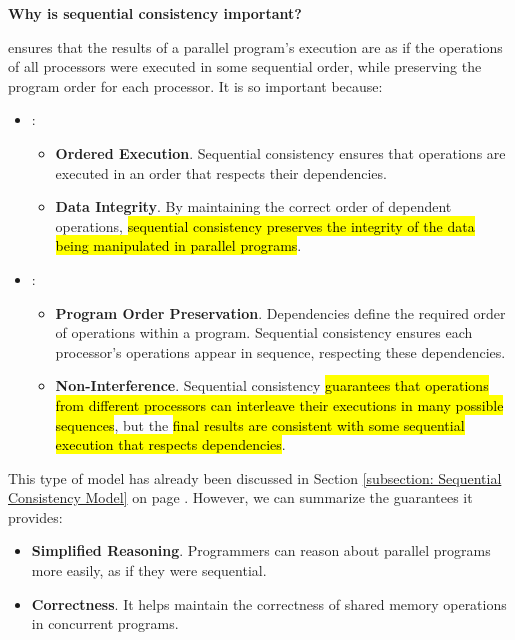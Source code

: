 \highspace
\begin{flushleft}
    \textcolor{Green3}{ \textbf{Why is sequential consistency important?}}
\end{flushleft}
 ensures that the results of a parallel program's execution are as if the operations of all processors were executed in some sequential order, while preserving the program order for each processor. It is so important because:
\begin{itemize}
    \item {}:
    \begin{itemize}
        \item \textbf{Ordered Execution}. Sequential consistency ensures that operations are executed in an order that respects their dependencies.

        \item \textbf{Data Integrity}. By maintaining the correct order of dependent operations, \hl{sequential consistency preserves the integrity of the data being manipulated in parallel programs}.
    \end{itemize}

    \item {}:
    \begin{itemize}
        \item \textbf{Program Order Preservation}. Dependencies define the required order of operations within a program. Sequential consistency ensures each processor's operations appear in sequence, respecting these dependencies.

        \item \textbf{Non-Interference}. Sequential consistency \hl{guarantees that operations from different processors can interleave their executions in many possible sequences}, but the \hl{final results are consistent with some sequential execution that respects dependencies}.
    \end{itemize}
\end{itemize}
This type of model has already been discussed in Section \ref{subsection: Sequential Consistency Model} on page \pageref{subsection: Sequential Consistency Model}. However, we can summarize the guarantees it provides:
\begin{itemize}[label=\textcolor{Green3}{}]
    \item \textcolor{Green3}{\textbf{Simplified Reasoning}}. Programmers can reason about parallel programs more easily, as if they were sequential.
    \item \textcolor{Green3}{\textbf{Correctness}}. It helps maintain the correctness of shared memory operations in concurrent programs.
\end{itemize}

